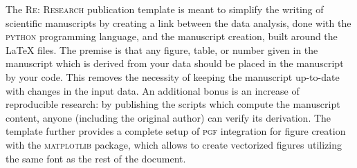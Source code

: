 The \textsc{Re: Research} publication template is meant to simplify
the writing of scientific manuscripts by creating a link between the
data analysis, done with the \textsc{python} programming language, and
the manuscript creation, built around the \LaTeX\xspace files. The premise is
that any figure, table, or number given in the manuscript which is
derived from your data should be placed in the manuscript by your
code. This removes the necessity of keeping the manuscript up-to-date
with changes in the input data. An additional bonus is an increase of
reproducible research: by publishing the scripts which compute the
manuscript content, anyone (including the original author) can verify
its derivation.
The template further provides a complete setup of \textsc{pgf}
integration for figure creation with the \textsc{matplotlib} package,
which allows to create vectorized figures utilizing the same font as
the rest of the document.
